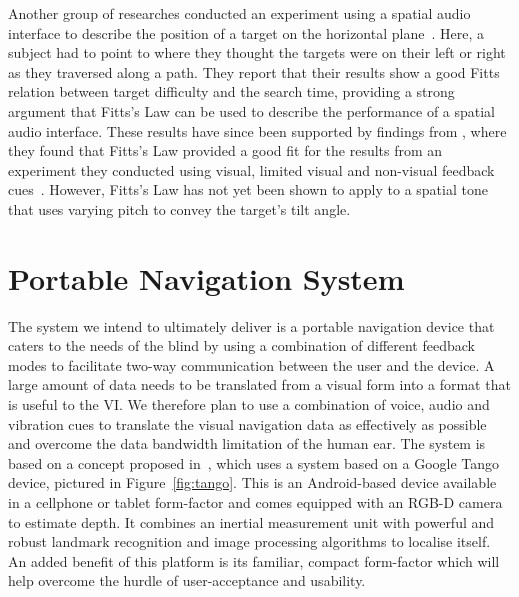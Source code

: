 \documentclass[format=sigconf, review=true, screen=true, anonymous=true]{acmart}
\begin{document}
Another group of researches conducted an experiment using a spatial audio interface to describe the position of a target on the horizontal plane~\cite{marentakis2006effects}. Here, a subject had to point to where they thought the targets were on their left or right as they traversed along a path. They report that their results show a good Fitts relation between target difficulty and the search time, providing a strong argument that Fitts's Law can be used to describe the performance of a spatial audio interface. These results have since been supported by findings from \citeauthor{wu2010fitts}, where they found that Fitts's Law provided a good fit for the results from an experiment they conducted using visual, limited visual and non-visual feedback cues~\cite{wu2010fitts}. However, Fitts's Law has not yet been shown to apply to a spatial tone that uses varying pitch to convey the target's tilt angle.


\section{Portable Navigation System}
\label{sec:portable-navigation}

The system we intend to ultimately deliver is a portable navigation device that caters to the needs of the blind by using a combination of different feedback modes to facilitate two-way communication between the user and the device. A large amount of data needs to be translated from a visual form into a format that is useful to the VI. We therefore plan to use a combination of voice, audio and vibration cues to translate the visual navigation data as effectively as possible and overcome the data bandwidth limitation of the human ear. The system is based on a concept proposed in~\cite{bellotto2013, lock2017portable}, which uses a system based on a Google Tango device, pictured in Figure~\ref{fig:tango}. This is an Android-based device available in a cellphone or tablet form-factor and comes equipped with an RGB-D camera to estimate depth. It combines an inertial measurement unit with powerful and robust landmark recognition and image processing algorithms to localise itself. An added benefit of this platform is its familiar, compact form-factor which will help overcome the hurdle of user-acceptance and usability. %
\end{document}
